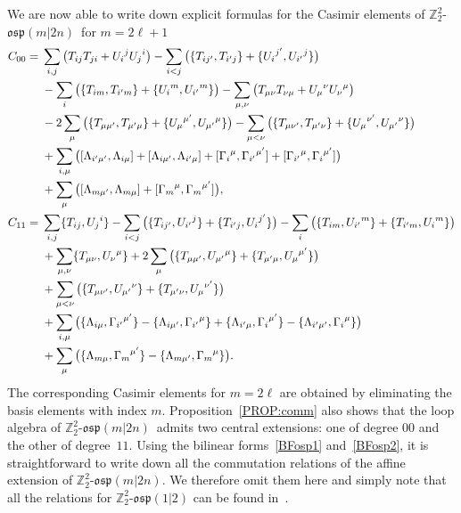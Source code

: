 \documentclass[pdftex]{sigma}
\numberwithin{equation}{section}
\theoremstyle{definition}
\def\nn{\notag}
\def\Z2{\mathbb{Z}_2^2}
\def\osp{\mathfrak{osp}}
\def\Zosp{$\Z2$-$\osp(m|2n)$}
\begin{document}
We are now able to write down explicit formulas for the Casimir elements of \Zosp\ for $m = 2\ell+1$
\begin{align*}
	C_{00}={}& \sum_{i,j} \big( T_{ij}T_{ji} + {U_{i}}^{j}{U_{j}}^{i} \big) - \sum_{i<j} \big( \{T_{ij'},T_{i'j}\} + \{{U_{i}}^{j'},{U_{i'}}^{j}\} \big) \nn\\
	&-\sum_i \big( \{T_{im},T_{i'm}\} + \{{U_{i}}^m,{U_{i'}}^m\} \big)
	 - \sum_{\mu,\nu} \big( T_{\mu\nu}T_{\nu\mu} + {U_{\mu}}^{\nu}{U_{\nu}}^{\mu} \big) \nn\\
	&- 2\sum_\mu\big( \{T_{\mu\mu'},T_{\mu'\mu}\} + \{{U_{\mu}}^{\mu'},{U_{\mu'}}^{\mu}\} \big) - \sum_{\mu<\nu}\big( \{T_{\mu\nu'},T_{\mu'\nu}\} + \{{U_{\mu}}^{\nu'},{U_{\mu'}}^{\nu}\} \big) \nn\\
	&+ \sum_{i,\mu} \big( [\Lambda_{i'\mu'},\Lambda_{i\mu}] + [\Lambda_{i\mu'},\Lambda_{i'\mu}] + [{\Gamma_{i}}^{\mu},{\Gamma_{i'}}^{\mu'}] + [{\Gamma_{i'}}^{\mu},{\Gamma_{i}}^{\mu'}] \big) \nn\\
	&+ \sum_{\mu}\big( [\Lambda_{m\mu'},\Lambda_{m\mu}] + [{\Gamma_m}^{\mu},{\Gamma_m}^{\mu'}] \big),
\\
	C_{11}={}& \sum_{i,j} \{T_{ij},{U_j}^{i}\} - \sum_{i<j} \big( \{T_{ij'},{U_{i'}}^{j}\} + \{T_{i'j},{U_{i}}^{j'}\} \big) - \sum_{i}\big( \{T_{im},{U_{i'}}^m\} + \{T_{i'm},{U_{i}}^m\} \big) \nn\\
	&+ \sum_{\mu,\nu} \{T_{\mu\nu},{U_{\nu}}^{\mu}\} + 2 \sum_{\mu} \big( \{T_{\mu\mu'},{U_{\mu'}}^{\mu}\} + \{T_{\mu'\mu},{U_{\mu}}^{\mu'}\} \big) \nn\\
	&+ \sum_{\mu<\nu} \big( \{T_{\mu\nu'},{U_{\mu'}}^{\nu}\} + \{T_{\mu'\nu},{U_{\mu}}^{\nu'}\} \big) \nn\\
	&+ \sum_{i,\mu} \big( \{\Lambda_{i\mu},{\Gamma_{i'}}^{\mu'}\} - \{\Lambda_{i\mu'},{\Gamma_{i'}}^{\mu}\} + \{\Lambda_{i'\mu},{\Gamma_{i}}^{\mu'}\} - \{\Lambda_{i'\mu'},{\Gamma_{i}}^{\mu}\}\big) \nn\\
	&+ \sum_\mu \big( \{\Lambda_{m\mu},{\Gamma_{m}}^{\mu'}\} - \{\Lambda_{m\mu'},{\Gamma_{m}}^{\mu}\} \big).
\end{align*}
The corresponding Casimir elements for $m = 2\ell$ are obtained by eliminating the basis elements with index $m$.
Proposition~\ref{PROP:comm} also shows that the loop algebra of \Zosp\ admits two central extensions: one of degree $00$ and the other of degree~$11$.
Using the bilinear forms~\eqref{BFosp1} and~\eqref{BFosp2}, it is straightforward to write down all the commutation relations of the affine extension of \Zosp.
We therefore omit them here and simply note that all the relations for $\Z2$-$\osp(1|2)$ can be found in~\cite{AiSe}.
\end{document}
